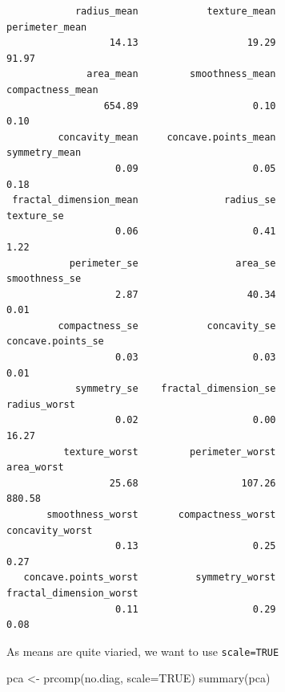 \documentclass[
  letterpaper,
  DIV=11,
  numbers=noendperiod]{scrartcl}
\newenvironment{Shaded}{\begin{snugshade}}{\end{snugshade}}
\newcommand{\AttributeTok}[1]{\textcolor[rgb]{0.40,0.45,0.13}{#1}}
\newcommand{\ConstantTok}[1]{\textcolor[rgb]{0.56,0.35,0.01}{#1}}
\newcommand{\FunctionTok}[1]{\textcolor[rgb]{0.28,0.35,0.67}{#1}}
\newcommand{\NormalTok}[1]{\textcolor[rgb]{0.00,0.23,0.31}{#1}}
\newcommand{\OtherTok}[1]{\textcolor[rgb]{0.00,0.23,0.31}{#1}}
\begin{document}
\begin{verbatim}
            radius_mean            texture_mean          perimeter_mean 
                  14.13                   19.29                   91.97 
              area_mean         smoothness_mean        compactness_mean 
                 654.89                    0.10                    0.10 
         concavity_mean     concave.points_mean           symmetry_mean 
                   0.09                    0.05                    0.18 
 fractal_dimension_mean               radius_se              texture_se 
                   0.06                    0.41                    1.22 
           perimeter_se                 area_se           smoothness_se 
                   2.87                   40.34                    0.01 
         compactness_se            concavity_se       concave.points_se 
                   0.03                    0.03                    0.01 
            symmetry_se    fractal_dimension_se            radius_worst 
                   0.02                    0.00                   16.27 
          texture_worst         perimeter_worst              area_worst 
                  25.68                  107.26                  880.58 
       smoothness_worst       compactness_worst         concavity_worst 
                   0.13                    0.25                    0.27 
   concave.points_worst          symmetry_worst fractal_dimension_worst 
                   0.11                    0.29                    0.08 
\end{verbatim}

As means are quite viaried, we want to use \texttt{scale=TRUE}

\begin{Shaded}
\begin{Highlighting}[]
\NormalTok{pca }\OtherTok{\textless{}{-}} \FunctionTok{prcomp}\NormalTok{(no.diag, }\AttributeTok{scale=}\ConstantTok{TRUE}\NormalTok{)}
\FunctionTok{summary}\NormalTok{(pca)}
\end{Highlighting}
\end{Shaded}
\end{document}

